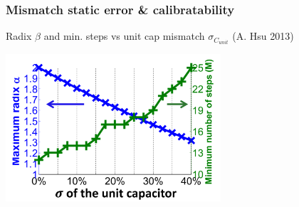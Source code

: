 \documentclass[aspectratio=169]{beamer}
\begin{document}
\begin{frame}
\frametitle{Mismatch static error \& calibratability}
  Radix $\beta$ and min. steps vs unit cap mismatch $\sigma_{C_{unit}}$ (A. Hsu 2013)
  \begin{center}
  \includegraphics[width=0.6\textwidth]{mismatch_vs_radix.png}
  \end{center}
\end{frame}



\end{document}
